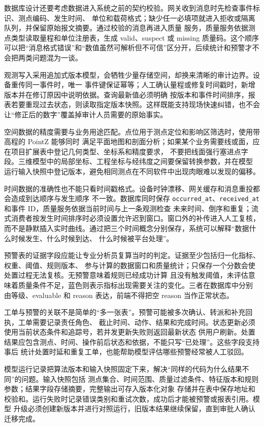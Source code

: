 数据库设计还要考虑数据进入系统之前的契约校验。网关收到消息时先检查事件标识、测点编码、发生时间、
单位和载荷格式；缺少任一必填项就进入拒收或隔离队列，并保留原始报文摘要。通过校验的消息再进入质量
服务，质量服务依据测点类型读取量程和单位注册表，生成 valid、suspect 或 missing 质量码。这个顺序
可以把“消息格式错误”和“数值虽然可解析但不可信”区分开，后续统计和预警才不会把两类问题混为一谈。

观测写入采用追加式版本模型，会牺牲少量存储空间，却换来清晰的审计边界。设备重传同一事件时，唯一
事件键保证幂等；人工确认量程或修复时间戳时，新增版本并在修订原因中说明依据。查询最新值必须明确
按版本和事件时间排序，报表若要重现过去状态，则读取指定版本快照。这样既能支持现场快速纠错，也不会
让“修正后的数字”覆盖掉审计人员需要的原始事实。

空间数据的精度需要与业务用途匹配。点位用于测点定位和影响区筛选时，使用带高程的 PointZ 能够同时
满足平面地图和剖面分析；如果某个业务需要线或面，应在项目扩展表中登记几何类型、坐标系和精度要求，
不要把线面强行塞进点字段。三维模型中的局部坐标、工程坐标与经纬度之间要保留转换参数，并在模型
运行输入快照中登记版本，避免相同测点在不同软件中出现肉眼难以发现的偏移。

时间数据的准确性也不能只看时间戳格式。设备时钟漂移、网关缓存和消息重投都会造成到达顺序与发生顺序
不一致。数据库同时保存 \texttt{occurred\_at}、\texttt{received\_at} 和事件 ID，质量服务依据当前时间与上一条观测检查
未来时间、倒序和重复；流式消费者按发生时间排序时必须设置允许迟到窗口。窗口外的补传进入人工复核，
而不是静默插入实时曲线。通过把三个时间概念分别保存，系统可以解释“数据什么时候发生、什么时候到达、
什么时候被平台处理”。

预警表的证据字段应能让专业分析员复算当时的判定。证据至少包括归一化指标、权重、阈值、规则版本、
参与计算的数据窗口和质量统计；只保存一个分数会使处置过程无法复核。无预警意味着规则已经成功计算
且没有触发阈值，未评估意味着质量条件不足，蓝色则表示指标出现需要关注的变化。三者在数据库中分别
由等级、evaluable 和 reason 表达，前端不得把空 reason 当作正常状态。

工单与预警的关联不是简单的“多一张表”。预警可能被多次确认、转派和补充回执，工单需要记录责任角色、
截止时间、动作、结果和完成时间。状态更新必须使用当前状态条件和追踪号，若并发更新失败则返回最新状态
供用户刷新。处置结果应包含测点、时间、操作前后状态和依据，不能只写“已处理”。这些字段支持事后
统计处置时延和重复工单，也能帮助模型评估哪些预警经常被人工驳回。

模型运行记录把算法版本和输入快照固定下来，解决“同样的代码为什么结果不同”的问题。输入快照包括
测点集合、时间范围、质量过滤条件、特征版本和规则参数；结果字段存储摘要，完整输出可存入版本化对象
存储并在表中保存地址和校验和。运行失败时记录错误类别和重试次数，成功后才能被预警或报表引用。模型
升级必须创建新版本并进行对照运行，旧版本结果继续保留，直到审批人确认迁移完成。

